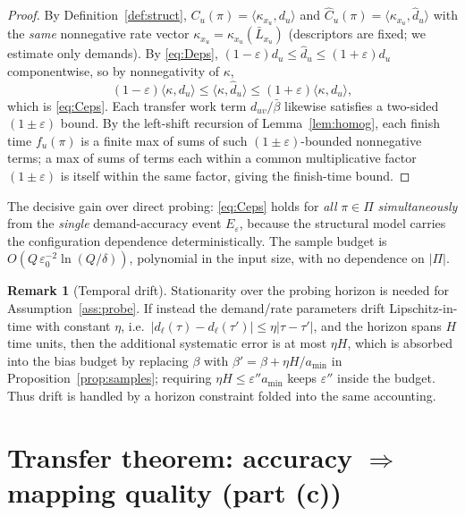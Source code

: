 \documentclass{amsart}
\theoremstyle{definition}
\newtheorem{remark}{Remark}
\newcommand{\Chat}{\widehat{C}}
\begin{document}
\begin{proof}
By Definition~\ref{def:struct}, $C_u(\pi)=\langle\kappa_{x_u},d_u\rangle$ and
$\Chat_u(\pi)=\langle\kappa_{x_u},\widehat d_u\rangle$ with the \emph{same}
nonnegative rate vector $\kappa_{x_u}=\kappa_{x_u}(\bar L_{x_u})$ (descriptors
are fixed; we estimate only demands). By \eqref{eq:Deps},
$(1-\varepsilon)d_u\le\widehat d_u\le(1+\varepsilon)d_u$ componentwise, so by
nonnegativity of $\kappa$,
\[
(1-\varepsilon)\langle\kappa,d_u\rangle\le\langle\kappa,\widehat d_u\rangle
\le(1+\varepsilon)\langle\kappa,d_u\rangle,
\]
which is \eqref{eq:Ceps}. Each transfer work term $d_{uv}/\bar\beta$ likewise
satisfies a two-sided $(1\pm\varepsilon)$ bound. By the left-shift recursion of
Lemma~\ref{lem:homog}, each finish time $f_u(\pi)$ is a finite max of sums of
such $(1\pm\varepsilon)$-bounded nonnegative terms; a max of sums of terms each
within a common multiplicative factor $(1\pm\varepsilon)$ is itself within the
same factor, giving the finish-time bound.
\end{proof}

The decisive gain over direct probing: \eqref{eq:Ceps} holds for \emph{all}
$\pi\in\Pi$ \emph{simultaneously} from the \emph{single} demand-accuracy event
$E_\varepsilon$, because the structural model carries the configuration
dependence deterministically. The sample budget is $O(Q\,\varepsilon_0^{-2}
\ln(Q/\delta))$, polynomial in the input size, with no dependence on $|\Pi|$.

\begin{remark}[Temporal drift]\label{rem:drift}
Stationarity over the probing horizon is needed for Assumption~\ref{ass:probe}.
If instead the demand/rate parameters drift Lipschitz-in-time with constant
$\eta$, i.e.\ $|d_\ell(\tau)-d_\ell(\tau')|\le\eta|\tau-\tau'|$, and the horizon
spans $H$ time units, then the additional systematic error is at most $\eta H$,
which is absorbed into the bias budget by replacing $\beta$ with
$\beta'=\beta+\eta H/a_{\min}$ in Proposition~\ref{prop:samples}; requiring
$\eta H\le\varepsilon'' a_{\min}$ keeps $\varepsilon''$ inside the budget. Thus
drift is handled by a horizon constraint folded into the same accounting.
\end{remark}

\section{Transfer theorem: accuracy $\Rightarrow$ mapping quality (part (c))}\label{sec:transfer}
\end{document}
